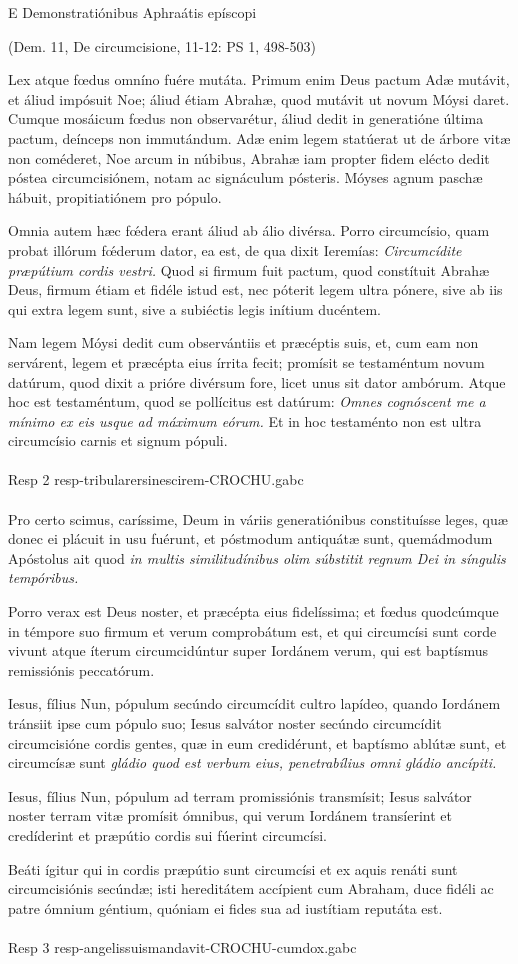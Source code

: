 \documentclass[options]{article}
\begin{document}
E Demonstratiónibus Aphraátis epíscopi
\begin{flushright}
(Dem. 11, De circumcisione, 11-12: PS 1, 498-503)
\end{flushright}
Lex atque fœdus omníno fuére mutáta. Primum enim Deus pactum Adæ mutávit, et áliud impósuit Noe; áliud étiam Abrahæ, quod mutávit ut novum Móysi daret. Cumque mosáicum fœdus non observarétur, áliud dedit in generatióne última pactum, deínceps non immutándum. Adæ enim legem statúerat ut de árbore vitæ non coméderet, Noe arcum in núbibus, Abrahæ iam propter fidem elécto dedit póstea circumcisiónem, notam ac signáculum pósteris. Móyses agnum paschæ hábuit, propitiatiónem pro pópulo.

Omnia autem hæc f\'{œ}dera erant áliud ab álio divérsa. Porro circumcísio, quam probat illórum f\'{œ}derum dator, ea est, de qua dixit Ieremías: \emph{Circumcídite præpútium cordis vestri.} Quod si firmum fuit pactum, quod constítuit Abrahæ Deus, firmum étiam et fidéle istud est, nec póterit legem ultra pónere, sive ab iis qui extra legem sunt, sive a subiéctis legis inítium ducéntem.

Nam legem Móysi dedit cum observántiis et præcéptis suis, et, cum eam non servárent, legem et præcépta eius írrita fecit; promísit se testaméntum novum datúrum, quod dixit a prióre divérsum fore, licet unus sit dator ambórum. Atque hoc est testaméntum, quod se pollícitus est datúrum: \emph{Omnes cognóscent me a mínimo ex eis usque ad máximum eórum.} Et in hoc testaménto non est ultra circumcísio carnis et signum pópuli.\\
\\
Resp 2 resp-tribularersinescirem-CROCHU.gabc
\\
\\
Pro certo scimus, caríssime, Deum in váriis generatiónibus constituísse leges, quæ donec ei plácuit in usu fuérunt, et póstmodum antiquátæ sunt, quemádmodum Apóstolus ait quod \emph{in multis similitudínibus olim súbstitit regnum Dei in síngulis tempóribus.}

 Porro verax est Deus noster, et præcépta eius fidelíssima; et fœdus quodcúmque in témpore suo firmum et verum comprobátum est, et qui circumcísi sunt corde vivunt atque íterum circumcidúntur super Iordánem verum, qui est baptísmus remissiónis peccatórum.
 
 Iesus, fílius Nun, pópulum secúndo circumcídit cultro lapídeo, quando Iordánem tránsiit ipse cum pópulo suo; Iesus salvátor noster secúndo circumcídit circumcisióne cordis gentes, quæ in eum credidérunt, et baptísmo ablútæ sunt, et circumcísæ sunt \emph{gládio quod est verbum eius, penetrabílius omni gládio ancípiti.}
 
 Iesus, fílius Nun, pópulum ad terram promissiónis transmísit; Iesus salvátor noster terram vitæ promísit ómnibus, qui verum Iordánem transíerint et credíderint et præpútio cordis sui fúerint circumcísi.
 
 Beáti ígitur qui in cordis præpútio sunt circumcísi et ex aquis renáti sunt circumcisiónis secúndæ; isti hereditátem accípient cum Abraham, duce fidéli ac patre ómnium géntium, quóniam ei fides sua ad iustítiam reputáta est.
 \\
 \\
 Resp 3 resp-angelissuismandavit-CROCHU-cumdox.gabc
\end{document}
